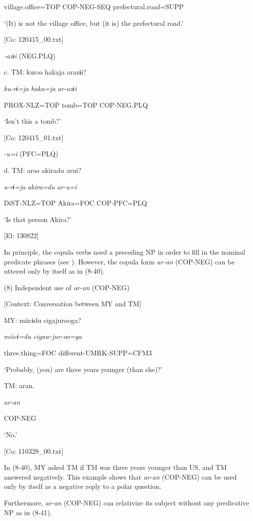       village.office=TOP  COP-NEG-SEQ    prefectural.road=SUPP

      ‘(It) is not the village office, but (it is) the prefectural road.’

      [Co: 120415\_00.txt]

  \textit{{}-azɨi} (NEG.PLQ)

  c.  TM:  kurəə  hakaja  arazɨi?

      \textit{ku-rɨ=ja}  \textit{haka=ja}  \textit{ar-azɨi}

      PROX-NLZ=TOP  tomb=TOP  COP-NEG.PLQ

      ‘Isn’t this a tomb?’

      [Co: 120415\_01.txt]

  \textit{{}-u=i} (PFC=PLQ)

  d.  TM:  arəə  akiradu  arui?

      \textit{a-rɨ=ja}  \textit{akira=du}  \textit{ar-u=i}

      DiST-NLZ=TOP  Akira=FOC  COP-PFC=PLQ

      ‘Is that person Akira?’

      [El: 130822]

  In principle, the copula verbs need a preceding NP in order to fill in the nominal predicate phrases (see ). However, the copula form \textit{ar-an} (COP-NEG) can be uttered only by itself as in (8-40).

(8)  Independent use of \textit{ar-an} (COP-NEG)

  [Context: Conversation between MY and TM]

  MY:  miicɨdu  cigajurooga?

    \textit{miicɨ=du}  \textit{cigaw-jur-oo=ga}

    three.thing=FOC  different-UMRK-SUPP=CFM3

    ‘Probably, (you) are three years younger (than she)?’

  TM:  aran.

    \textit{ar-an}

    COP-NEG

    ‘No.’

    [Co: 110328\_00.txt]

In (8-40), MY asked TM if TM was three years younger than US, and TM answered negatively. This example shows that \textit{ar-an} (COP-NEG) can be used only by itself as a negative reply to a polar question.

  Furthermore, \textit{ar-an} (COP-NEG) can relativize its subject without any predicative NP as in (8-41).

